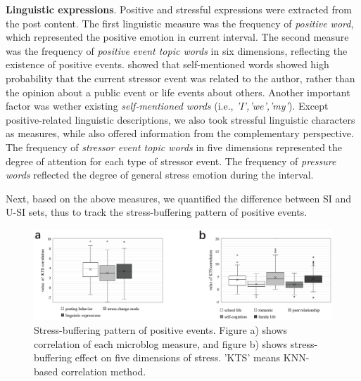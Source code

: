 \textbf{Linguistic expressions}.
Positive and stressful expressions were extracted from the post content.
The first linguistic measure was the frequency of \emph{positive word},
which represented the positive emotion in current interval.
The second measure was the frequency of \emph{positive event topic words} in six dimensions,
reflecting the existence of positive events.
\citep{Li2014Major} showed that self-mentioned words showed high probability that the current stressor event was related to the author,
rather than the opinion about a public event or life events about others.
Another important factor was wether existing \emph{self-mentioned words} (i.e., \emph{'I','we','my'}).
Except positive-related linguistic descriptions, we also took stressful linguistic characters as measures,
while also offered information from the complementary perspective.
The frequency of \emph{stressor event topic words} in five dimensions represented the degree of attention for each type of stressor event.
The frequency of \emph{pressure words} reflected the degree of general stress emotion during the interval.

Next,
based on the above measures,
we quantified the difference between SI and U-SI sets, thus to track the stress-buffering pattern of positive events.

\begin{figure}
\centering
\includegraphics[width=0.9\linewidth]{figs/BOX3.eps}%
\caption{Stress-buffering pattern of positive events. Figure a) shows correlation of each microblog measure,
and figure b) shows stress-buffering effect on five dimensions of stress. 'KTS' means KNN-based correlation method.}
\label{fig:correlation}
\end{figure}

